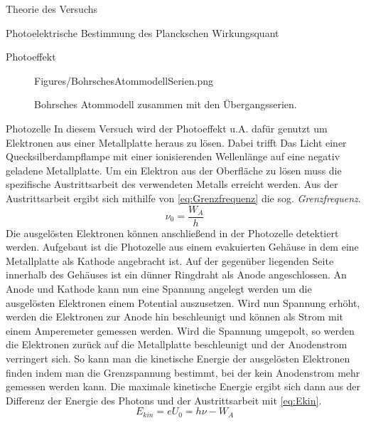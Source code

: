 \documentclass[pdftex, a4paper,11pt, twoside, ngerman]{report}
\begin{document}
\begin{chapter}{Theorie des Versuchs}
\begin{section}{Photoelektrische Bestimmung des Planckschen Wirkungsquant}
\begin{subsection}{Photoeffekt}
\begin{figure}[htbp]
\begin{minipage}{0.48\textwidth}
                {Figures/BohrschesAtommodellSerien.png}
            \caption{Bohrsches Atommodell zusammen mit den Übergangsserien.
                \cite{bib:BohrschesAtommodellSerien}}
            \label{fig:BohrschesAtommodellSerien}
          \end{minipage}
        \end{figure}
       
      \end{subsection}
     
     
     
      \begin{subsection}{Photozelle}
        \label{chp:TheoriePhotoelektrischesWirkungsquantumPhotozelle}
        In diesem Versuch wird der Photoeffekt u.A. dafür genutzt um Elektronen
        aus einer Metallplatte heraus zu lösen. Dabei trifft Das Licht einer
        Quecksilberdampflampe mit einer ionisierenden Wellenlänge auf eine
        negativ geladene Metallplatte. Um ein Elektron aus der Oberfläche zu
        lösen muss die spezifische Austrittsarbeit des verwendeten Metalls
        erreicht werden. Aus der Austrittsarbeit ergibt sich mithilfe von
        \cref{eq:Grenzfrequenz} die sog. \textit{Grenzfrequenz}.
        \begin{equation}
          \label{eq:Grenzfrequenz}
          \nu_{0}=\frac{W_{A}}{h}
        \end{equation}
        Die ausgelösten Elektronen können anschließend in der Photozelle
        detektiert werden. Aufgebaut ist die Photozelle aus einem evakuierten
        Gehäuse in dem eine Metallplatte als Kathode angebracht ist. Auf der
        gegenüber liegenden Seite innerhalb des Gehäuses ist ein dünner
        Ringdraht als Anode angeschlossen. An Anode und Kathode kann nun eine
        Spannung angelegt werden um die ausgelösten Elektronen einem Potential
        auszusetzen. Wird nun Spannung erhöht, werden die Elektronen zur Anode
        hin beschleunigt und können als Strom mit einem Amperemeter gemessen
        werden. Wird die Spannung umgepolt, so werden die Elektronen zurück
        auf die Metallplatte beschleunigt und der Anodenstrom verringert sich.
        So kann man die kinetische Energie der ausgelösten Elektronen finden
        indem man die Grenzspannung bestimmt, bei der kein Anodenstrom mehr
        gemessen werden kann. Die maximale kinetische Energie ergibt sich dann
        aus der Differenz der Energie des Photons und der Austrittsarbeit mit
        \cref{eq:Ekin}.
        \begin{equation}
          \label{eq:Ekin}
          E_{kin}=eU_{0}=h\nu-W_{A}
        \end{equation}
       

\end{subsection}
\end{section}
\end{chapter}
\end{document}
